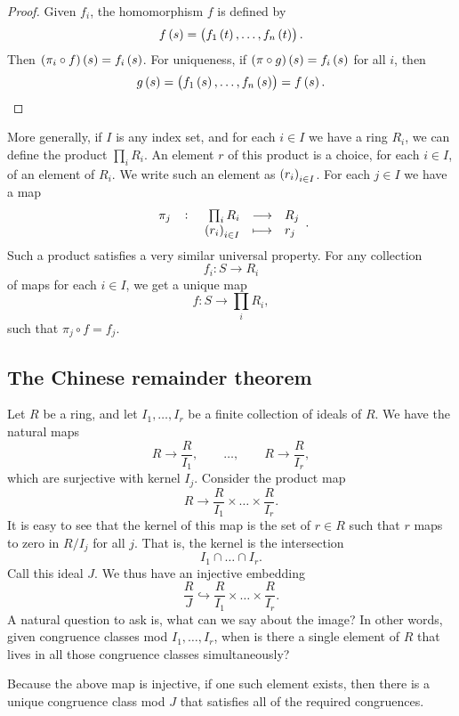 \begin{proof}
Given $ f_i $, the homomorphism $ f $ is defined by
$$ f\br{s} = \br{f_1\br{t}, \dots, f_n\br{t}}. $$
Then $ \br{\pi_i \circ f}\br{s} = f_i\br{s} $. For uniqueness, if $ \br{\pi \circ g}\br{s} = f_i\br{s} $ for all $ i $, then
$$ g\br{s} = \br{f_1\br{s}, \dots, f_n\br{s}} = f\br{s}. $$
\end{proof}

More generally, if $ I $ is any index set, and for each $ i \in I $ we have a ring $ R_i $, we can define the product $ \prod_i R_i $. An element $ r $ of this product is a choice, for each $ i \in I $, of an element of $ R_i $. We write such an element as $ \br{r_i}_{i \in I} $. For each $ j \in I $ we have a map
$$ \function[\pi_j]{\prod_i R_i}{R_j}{\br{r_i}_{i \in I}}{r_j}. $$
Such a product satisfies a very similar universal property. For any collection
$$ f_i : S \to R_i $$
of maps for each $ i \in I $, we get a unique map
$$ f : S \to \prod_i R_i, $$
such that $ \pi_j \circ f = f_j $.

\pagebreak

\subsection{The Chinese remainder theorem}

Let $ R $ be a ring, and let $ I_1, \dots, I_r $ be a finite collection of ideals of $ R $. We have the natural maps
$$ R \to \dfrac{R}{I_1}, \qquad \dots, \qquad R \to \dfrac{R}{I_r}, $$
which are surjective with kernel $ I_j $. Consider the product map
$$ R \to \dfrac{R}{I_1} \times \dots \times \dfrac{R}{I_r}. $$
It is easy to see that the kernel of this map is the set of $ r \in R $ such that $ r $ maps to zero in $ R / I_j $ for all $ j $. That is, the kernel is the intersection
$$ I_1 \cap \dots \cap I_r. $$
Call this ideal $ J $. We thus have an injective embedding
$$ \dfrac{R}{J} \hookrightarrow \dfrac{R}{I_1} \times \dots \times \dfrac{R}{I_r}. $$
A natural question to ask is, what can we say about the image? In other words, given congruence classes mod $ I_1, \dots, I_r $, when is there a single element of $ R $ that lives in all those congruence classes simultaneously?

\begin{note*}
Because the above map is injective, if one such element exists, then there is a unique congruence class mod $ J $ that satisfies all of the required congruences.
\end{note*}

